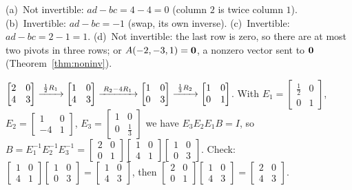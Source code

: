 \documentclass[11pt]{article}
\begin{document}
\begin{description}[leftmargin=0pt,itemsep=5pt]
  \item[Knowledge Check \ref{kc:invornot}.] (a)~Not invertible: $ad-bc=4-4=0$ (column $2$ is twice column $1$). (b)~Invertible: $ad-bc=-1$ (swap, its own inverse). (c)~Invertible: $ad-bc=2-1=1$. (d)~Not invertible: the last row is zero, so there are at most two pivots in three rows; or $A(-2,-3,1)=\mathbf{0}$, a nonzero vector sent to $\mathbf{0}$ (Theorem~\ref{thm:noninv}).
  \item[Knowledge Check \ref{kc:factorkc}.] $\begin{bmatrix}2&0\\4&3\end{bmatrix}\xrightarrow{\;\frac12R_1\;}\begin{bmatrix}1&0\\4&3\end{bmatrix}\xrightarrow{\;R_2-4R_1\;}\begin{bmatrix}1&0\\0&3\end{bmatrix}\xrightarrow{\;\frac13R_2\;}\begin{bmatrix}1&0\\0&1\end{bmatrix}$. With $E_1=\begin{bmatrix}\tfrac12&0\\0&1\end{bmatrix}$, $E_2=\begin{bmatrix}1&0\\-4&1\end{bmatrix}$, $E_3=\begin{bmatrix}1&0\\0&\tfrac13\end{bmatrix}$ we have $E_3E_2E_1B=I$, so $B=E_1^{-1}E_2^{-1}E_3^{-1}=\begin{bmatrix}2&0\\0&1\end{bmatrix}\begin{bmatrix}1&0\\4&1\end{bmatrix}\begin{bmatrix}1&0\\0&3\end{bmatrix}$. Check: $\begin{bmatrix}1&0\\4&1\end{bmatrix}\begin{bmatrix}1&0\\0&3\end{bmatrix}=\begin{bmatrix}1&0\\4&3\end{bmatrix}$, then $\begin{bmatrix}2&0\\0&1\end{bmatrix}\begin{bmatrix}1&0\\4&3\end{bmatrix}=\begin{bmatrix}2&0\\4&3\end{bmatrix}$.

\end{description}
\end{document}
